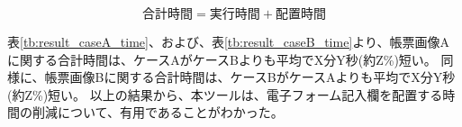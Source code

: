 \begin{equation}\label{eq:sum_time}
    合計時間=実行時間+配置時間
\end{equation}

表\ref{tb:result_caseA_time}、および、表\ref{tb:result_caseB_time}より、帳票画像Aに関する合計時間は、ケースAがケースBよりも平均でX分Y秒(約Z\%)短い。
同様に、帳票画像Bに関する合計時間は、ケースBがケースAよりも平均でX分Y秒(約Z\%)短い。
以上の結果から、本ツールは、電子フォーム記入欄を配置する時間の削減について、有用であることがわかった。







